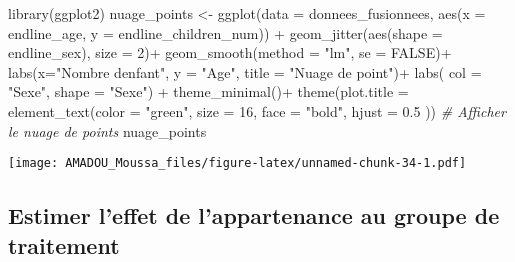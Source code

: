 \documentclass[
  14pt,
]{article}
\newenvironment{Shaded}{\begin{snugshade}}{\end{snugshade}}
\newcommand{\AttributeTok}[1]{\textcolor[rgb]{0.77,0.63,0.00}{#1}}
\newcommand{\CommentTok}[1]{\textcolor[rgb]{0.56,0.35,0.01}{\textit{#1}}}
\newcommand{\ConstantTok}[1]{\textcolor[rgb]{0.00,0.00,0.00}{#1}}
\newcommand{\DecValTok}[1]{\textcolor[rgb]{0.00,0.00,0.81}{#1}}
\newcommand{\FloatTok}[1]{\textcolor[rgb]{0.00,0.00,0.81}{#1}}
\newcommand{\FunctionTok}[1]{\textcolor[rgb]{0.00,0.00,0.00}{#1}}
\newcommand{\NormalTok}[1]{#1}
\newcommand{\OtherTok}[1]{\textcolor[rgb]{0.56,0.35,0.01}{#1}}
\newcommand{\SpecialCharTok}[1]{\textcolor[rgb]{0.00,0.00,0.00}{#1}}
\newcommand{\StringTok}[1]{\textcolor[rgb]{0.31,0.60,0.02}{#1}}
\begin{document}
\begin{Shaded}
\begin{Highlighting}[]
\FunctionTok{library}\NormalTok{(ggplot2)}
\NormalTok{nuage\_points }\OtherTok{\textless{}{-}} \FunctionTok{ggplot}\NormalTok{(}\AttributeTok{data =}\NormalTok{ donnees\_fusionnees, }
                       \FunctionTok{aes}\NormalTok{(}\AttributeTok{x =}\NormalTok{ endline\_age, }
                           \AttributeTok{y =}\NormalTok{ endline\_children\_num)) }\SpecialCharTok{+}
  \FunctionTok{geom\_jitter}\NormalTok{(}\FunctionTok{aes}\NormalTok{(}\AttributeTok{shape =}\NormalTok{ endline\_sex),}
              \AttributeTok{size =} \DecValTok{2}\NormalTok{)}\SpecialCharTok{+}
  \FunctionTok{geom\_smooth}\NormalTok{(}\AttributeTok{method =} \StringTok{"lm"}\NormalTok{,}
              \AttributeTok{se =} \ConstantTok{FALSE}\NormalTok{)}\SpecialCharTok{+}
  \FunctionTok{labs}\NormalTok{(}\AttributeTok{x=}\StringTok{"Nombre d\textquotesingle{}enfant"}\NormalTok{,}
       \AttributeTok{y =} \StringTok{"Age"}\NormalTok{, }
       \AttributeTok{title =} \StringTok{"Nuage de point"}\NormalTok{)}\SpecialCharTok{+}
  \FunctionTok{labs}\NormalTok{( }\AttributeTok{col =} \StringTok{"Sexe"}\NormalTok{,}
        \AttributeTok{shape =} \StringTok{"Sexe"}\NormalTok{) }\SpecialCharTok{+}
  \FunctionTok{theme\_minimal}\NormalTok{()}\SpecialCharTok{+}
  \FunctionTok{theme}\NormalTok{(}\AttributeTok{plot.title =} \FunctionTok{element\_text}\NormalTok{(}\AttributeTok{color =} \StringTok{"green"}\NormalTok{, }
                                  \AttributeTok{size =} \DecValTok{16}\NormalTok{, }
                                  \AttributeTok{face =} \StringTok{"bold"}\NormalTok{,}
                                  \AttributeTok{hjust =} \FloatTok{0.5}\NormalTok{ ))}
\CommentTok{\# Afficher le nuage de points}
\NormalTok{nuage\_points}
\end{Highlighting}
\end{Shaded}

\texttt{[image: AMADOU\_Moussa\_files/figure-latex/unnamed-chunk-34-1.pdf]}

\hypertarget{estimer-leffet-de-lappartenance-au-groupe-de-traitement}{%
\subsection{\texorpdfstring{\textbf{Estimer l'effet de l'appartenance au
groupe de traitement}\\
}{Estimer l'effet de l'appartenance au groupe de traitement }}\label{estimer-leffet-de-lappartenance-au-groupe-de-traitement}}
\end{document}
